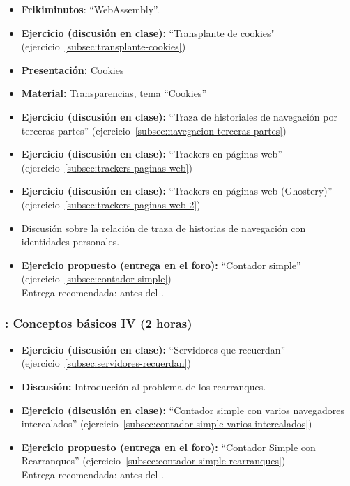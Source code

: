 \documentclass[a4paper,12pt]{article}
\begin{document}
\begin{itemize}
  \item \textbf{Frikiminutos}: ``WebAssembly''.

  \item \textbf{Ejercicio (discusión en clase):} ``Transplante de cookies" (ejercicio~\ref{subsec:transplante-cookies})  

  \item \textbf{Presentación:} Cookies
  \item \textbf{Material:} Transparencias, tema ``Cookies''

  \item \textbf{Ejercicio (discusión en clase):} ``Traza de historiales de navegación por terceras partes'' (ejercicio~\ref{subsec:navegacion-terceras-partes})
  \item \textbf{Ejercicio (discusión en clase):} ``Trackers en páginas web'' (ejercicio~\ref{subsec:trackers-paginas-web})
  \item \textbf{Ejercicio (discusión en clase):} ``Trackers en páginas web (Ghostery)'' (ejercicio~\ref{subsec:trackers-paginas-web-2})
  \item Discusión sobre la relación de traza de historias de navegación con identidades personales.
  

\item \textbf{Ejercicio propuesto (entrega en el foro):} ``Contador simple'' (ejercicio~\ref{subsec:contador-simple}) \\
  Entrega recomendada: antes del \martesE.
\end{itemize}


\subsubsection{\martesE: Conceptos básicos IV (2 horas)}
\label{cal:martesE}

\begin{itemize}
\item \textbf{Ejercicio (discusión en clase):} ``Servidores que recuerdan'' (ejercicio~\ref{subsec:servidores-recuerdan})
\item \textbf{Discusión:} Introducción al problema de los rearranques.
\item \textbf{Ejercicio (discusión en clase):} ``Contador simple con varios navegadores intercalados'' (ejercicio~\ref{subsec:contador-simple-varios-intercalados})
\item \textbf{Ejercicio propuesto (entrega en el foro):} ``Contador Simple con Rearranques'' (ejercicio~\ref{subsec:contador-simple-rearranques})
 \\
  Entrega recomendada: antes del \martesF.
\end{itemize}
\end{document}
